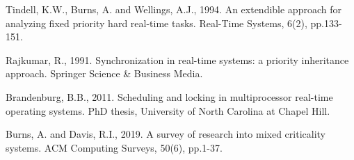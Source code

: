 \documentclass[12pt,a4paper]{article}
\begin{document}
\begin{thebibliography}{15}
Tindell, K.W., Burns, A. and Wellings, A.J., 1994. An extendible approach for analyzing fixed priority hard real-time tasks. Real-Time Systems, 6(2), pp.133-151.

Rajkumar, R., 1991. Synchronization in real-time systems: a priority inheritance approach. Springer Science \& Business Media.

Brandenburg, B.B., 2011. Scheduling and locking in multiprocessor real-time operating systems. PhD thesis, University of North Carolina at Chapel Hill.

Burns, A. and Davis, R.I., 2019. A survey of research into mixed criticality systems. ACM Computing Surveys, 50(6), pp.1-37.

\end{thebibliography}
\end{document}
